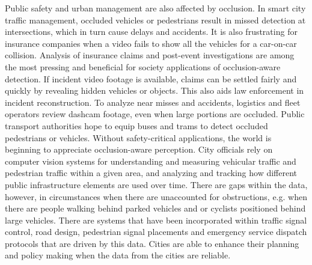 \documentclass[12pt,a4paper]{report}
\theoremstyle{definition}
\theoremstyle{remark}
\begin{document}
Public safety and urban management are also affected by occlusion. In smart city traffic management, occluded vehicles or pedestrians result in missed detection at intersections, which in turn cause delays and accidents.  It is also frustrating for insurance companies when a video fails to show all the vehicles for a car-on-car collision. Analysis of insurance claims and post-event investigations are among the most pressing and beneficial for society applications of occlusion-aware detection. If incident video footage is available, claims can be settled fairly and quickly by revealing hidden vehicles or objects. This also aids law enforcement in incident reconstruction. To analyze near misses and accidents, logistics and fleet operators review dashcam footage, even when large portions are occluded.  Public transport authorities hope to equip buses and trams to detect occluded pedestrians or vehicles. Without safety-critical applications, the world is beginning to appreciate occlusion-aware perception. City officials rely on computer vision systems for understanding and measuring vehicular traffic and pedestrian traffic within a given area, and analyzing and tracking how different public infrastructure elements are used over time. There are gaps within the data, however, in circumstances when there are unaccounted for obstructions, e.g. when there are people walking behind parked vehicles and or cyclists positioned behind large vehicles. There are systems that have been incorporated within traffic signal control, road design, pedestrian signal placements and emergency service dispatch protocols that are driven by this data. Cities are able to enhance their planning and policy making when the data from the cities are reliable.
\end{document}
